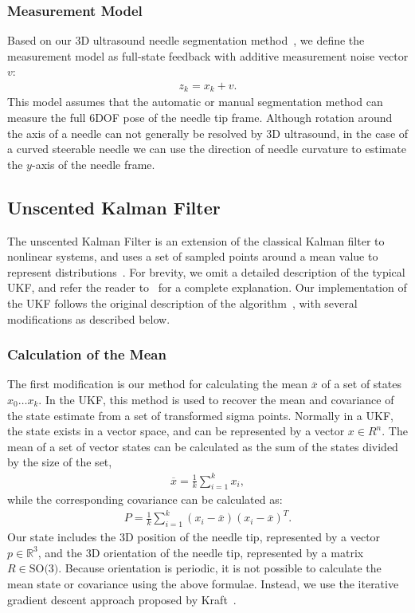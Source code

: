 \subsubsection{Measurement Model}
Based on our 3D ultrasound needle segmentation method~\cite{Adebar2013}, we define the measurement model as full-state feedback with additive measurement noise vector ${v}$:
\begin{align}
{z_{k}} = {x_k} + {v}.
\end{align}
This model assumes that the automatic or manual segmentation method can measure the full 6DOF pose of the needle tip frame. Although rotation around the axis of a needle can not generally be resolved by 3D ultrasound, in the case of a curved steerable needle we can use the direction of needle curvature to estimate the $y$-axis of the needle frame.

\subsection{Unscented Kalman Filter}
The unscented Kalman Filter is an extension of the classical Kalman filter to nonlinear systems, and uses a set of sampled points around a mean value to represent distributions~\cite{Julier1997}. For brevity, we omit a detailed description of the typical UKF, and refer the reader to~\cite{Thrun2005} for a complete explanation. Our implementation of the UKF follows the original description of the algorithm~\cite{Julier1997}, with several modifications as described below. 

\subsubsection{Calculation of the Mean}
The first modification is our method for calculating the mean $\overline{x}$ of a set of states $x_0 \dots x_k$. In the UKF, this method is used to recover the mean and covariance of the state estimate from a set of transformed sigma points. Normally in a UKF, the state exists in a vector space, and can be represented by a vector $x \in R^n$. The mean of a set of vector states can be calculated as the sum of the states divided by the size of the set,
\begin{align}
\overline{x} = \frac{1}{k}\sum\limits_{i=1}^{k} x_i,
\end{align}
\noindent 
while the corresponding covariance can be calculated as:
\begin{align}
P = \frac{1}{k}\sum\limits_{i=1}^{k} (x_i-\overline{x})(x_i-\overline{x})^T.
\end{align}
\noindent
Our state includes the 3D position of the needle tip, represented by a vector ${p} \in \mathbb{R}^3$, and the 3D orientation of the needle tip, represented by a matrix ${R} \in \textrm{SO(3)}$. Because orientation is periodic, it is not possible to calculate the mean state or covariance using the above formulae. Instead, we use the iterative gradient descent approach proposed by Kraft~\cite{Kraft2003}. 

